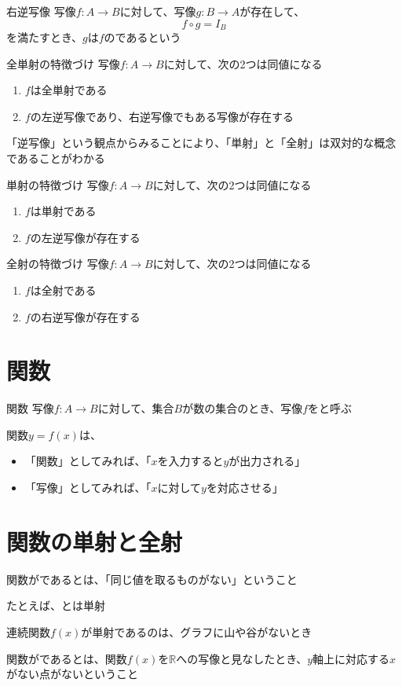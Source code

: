 \documentclass[b5paper,12pt,notitlepage]{jsreport}
\begin{document}
\begin{definition}{右逆写像}
  写像$f\colon A \to B$に対して、写像$g\colon B \to A$が存在して、
  \begin{equation*}
    f \circ g = I_B
  \end{equation*}
  を満たすとき、$g$は$f$のであるという
\end{definition}

\begin{theorem}{全単射の特徴づけ}
  写像$f\colon A \to B$に対して、次の2つは同値になる
  \begin{enumerate}
    \item $f$は全単射である
    \item $f$の左逆写像であり、右逆写像でもある写像が存在する
  \end{enumerate}
\end{theorem}

\sectionline

「逆写像」という観点からみることにより、「単射」と「全射」は双対的な概念であることがわかる

\begin{theorem}{単射の特徴づけ}
  写像$f\colon A \to B$に対して、次の2つは同値になる
  \begin{enumerate}
    \item $f$は単射である
    \item $f$の左逆写像が存在する
  \end{enumerate}
\end{theorem}

\begin{theorem}{全射の特徴づけ}
  写像$f\colon A \to B$に対して、次の2つは同値になる
  \begin{enumerate}
    \item $f$は全射である
    \item $f$の右逆写像が存在する
  \end{enumerate}
\end{theorem}

\sectionline
\section{関数}

\begin{definition}{関数}
  写像$f\colon A \to B$に対して、集合$B$が数の集合のとき、写像$f$をと呼ぶ
\end{definition}

関数$y=f(x)$は、
\begin{itemize}
  \item 「関数」としてみれば、「$x$を入力すると$y$が出力される」
  \item 「写像」としてみれば、「$x$に対して$y$を対応させる」
\end{itemize}

\sectionline
\section{関数の単射と全射}

関数がであるとは、「同じ値を取るものがない」ということ

たとえば、とは単射

連続関数$f(x)$が単射であるのは、グラフに山や谷がないとき

\sectionline

関数がであるとは、関数$f(x)$を$\mathbb{R}$への写像と見なしたとき、$y$軸上に対応する$x$がない点がないということ
\end{document}
